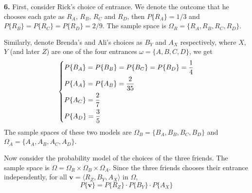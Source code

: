 \documentclass[a4paper,12pt]{article}
\newcommand{\exercise}[1]{\noindent\textbf{#1.}}
\begin{document}
\exercise 6  First, consider Rick's choice of entrance.  We denote
the outcome that he chooses each gate as $R_A$, $R_B$, $R_C$ and $R_D$,
then $P\{R_A\} = 1/3$ and $P\{R_B\} = P\{R_C\} = P\{R_D\} = 2/9$.
The sample space is $\Omega_R = \{R_A, R_B, R_C, R_D\}$.

Similarly, denote Brenda's and Ali's choices as $B_Y$ and $A_X$ respectively,
where $X$, $Y$ (and later $Z$) are one of the four entrances
$\omega = \{A, B, C, D\}$, we get
\[\begin{dcases}
  P\{B_A\} = P\{B_B\} = P\{B_C\} = P\{B_D\} = \frac 1 4\\
  P\{A_A\} = P\{A_B\} = \frac{2}{35}\\
  P\{A_C\} = \frac 2 7\\
  P\{A_D\} = \frac 3 5
\end{dcases}\]
The sample spaces of these two models are $\Omega_B = \{B_A, B_B, B_C, B_D\}$
and $\Omega_A = \{A_A, A_B, A_C, A_D\}$.

Now consider the probability model of the choices of the three friends.
The sample space is $\Omega = \Omega_R\times\Omega_B\times\Omega_A$.
Since the three friends chooses their entrance independently,
for all $\mathbf v = \langle R_Z, B_Y, A_X\rangle$ in $\Omega$,
\[P\{\mathbf v\} = P\{R_Z\} \cdot P\{B_Y\} \cdot P\{A_X\}\]
\end{document}
